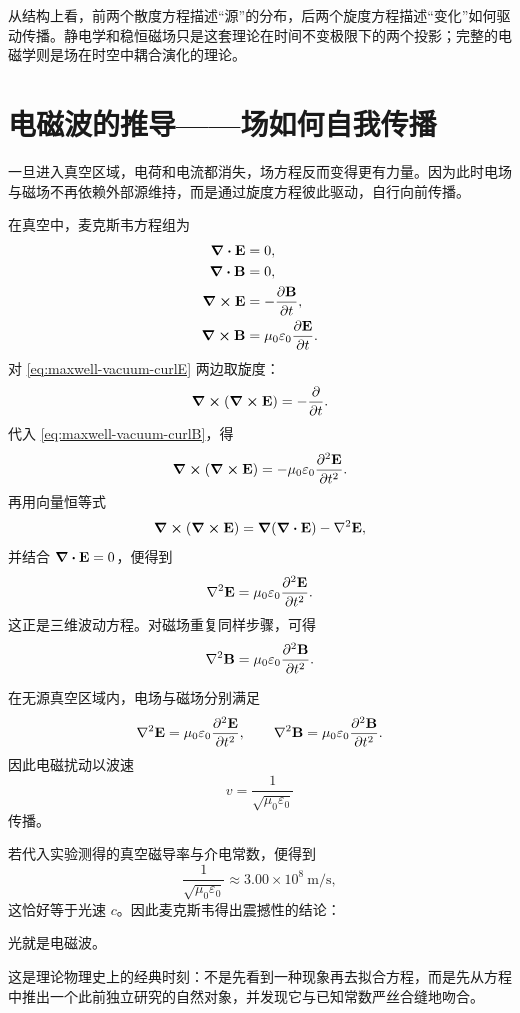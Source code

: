 \begin{remark}
从结构上看，前两个散度方程描述“源”的分布，后两个旋度方程描述“变化”如何驱动传播。静电学和稳恒磁场只是这套理论在时间不变极限下的两个投影；完整的电磁学则是场在时空中耦合演化的理论。
\end{remark}

\section{电磁波的推导——场如何自我传播}

一旦进入真空区域，电荷和电流都消失，场方程反而变得更有力量。因为此时电场与磁场不再依赖外部源维持，而是通过旋度方程彼此驱动，自行向前传播。

在真空中，麦克斯韦方程组为
\begin{align}
\div \vb{E} &= 0, \label{eq:maxwell-vacuum-divE}\\
\div \vb{B} &= 0, \label{eq:maxwell-vacuum-divB}\\
\curl \vb{E} &= -\pdv{\vb{B}}{t}, \label{eq:maxwell-vacuum-curlE}\\
\curl \vb{B} &= \mu_0\varepsilon_0\pdv{\vb{E}}{t}. \label{eq:maxwell-vacuum-curlB}
\end{align}
对 \cref{eq:maxwell-vacuum-curlE} 两边取旋度：
\[
\curl(\curl \vb{E})=-\pdv{}{t}(\curl \vb{B}).
\]
代入 \cref{eq:maxwell-vacuum-curlB}，得
\[
\curl(\curl \vb{E})=-\mu_0\varepsilon_0\pdv[2]{\vb{E}}{t}.
\]
再用向量恒等式
\[
\curl(\curl \vb{E})=\grad(\div\vb{E})-\nabla^2 \vb{E},
\]
并结合 $\div\vb{E}=0$，便得到
\[
\nabla^2 \vb{E}=\mu_0\varepsilon_0\pdv[2]{\vb{E}}{t}.
\]
这正是三维波动方程。对磁场重复同样步骤，可得
\[
\nabla^2 \vb{B}=\mu_0\varepsilon_0\pdv[2]{\vb{B}}{t}.
\]

\begin{theorem}[真空中的电磁波动方程]
在无源真空区域内，电场与磁场分别满足
\[
\nabla^2 \vb{E}=\mu_0\varepsilon_0\pdv[2]{\vb{E}}{t},
\qquad
\nabla^2 \vb{B}=\mu_0\varepsilon_0\pdv[2]{\vb{B}}{t}.
\]
因此电磁扰动以波速
\[
 v=\frac{1}{\sqrt{\mu_0\varepsilon_0}}
\]
传播。
\end{theorem}

若代入实验测得的真空磁导率与介电常数，便得到
\[
\frac{1}{\sqrt{\mu_0\varepsilon_0}}\approx 3.00\times 10^8\ \text{m/s},
\]
这恰好等于光速 $c$。因此麦克斯韦得出震撼性的结论：
\begin{center}
\Large 光就是电磁波。
\end{center}

这是理论物理史上的经典时刻：不是先看到一种现象再去拟合方程，而是先从方程中推出一个此前独立研究的自然对象，并发现它与已知常数严丝合缝地吻合。

